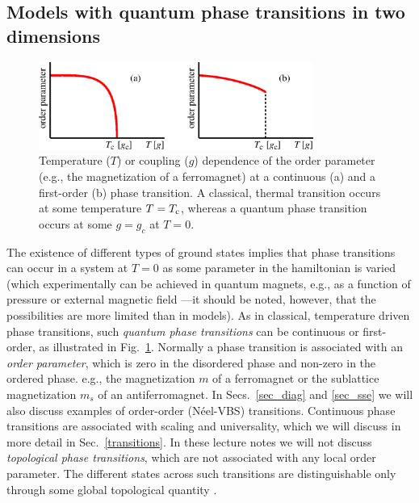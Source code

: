 \documentclass[draft,numberedheadings]{aipproc}
\begin{document}
\subsection{Models with quantum phase transitions in two dimensions}
\label{qtrans}

\begin{figure}
\includegraphics[width=9cm, clip]{ptcases.eps}
\caption{Temperature ($T$) or coupling ($g$) dependence of the order parameter (e.g., the magnetization of a ferromagnet) at a continuous (a) 
and a first-order (b) phase transition. A classical, thermal transition occurs at some temperature $T=T_{\rm c}$, whereas a quantum
phase transition occurs at some $g=g_c$ at $T=0$.}
\label{ptcases}
\end{figure}

The existence of different types of ground states implies that phase transitions can occur in a system at $T=0$ as some parameter in the hamiltonian is varied 
(which experimentally can be achieved in quantum magnets, e.g., as a function of pressure or external magnetic field \cite{ruegg08}---it should be 
noted, however, that the possibilities 
are more limited than in models). As in classical, temperature driven phase transitions, such {\it quantum phase 
transitions} can be continuous or first-order, as illustrated in Fig.~\ref{ptcases}. Normally a phase transition is associated with an {\it order parameter}, 
which is zero in the disordered phase and non-zero in the ordered phase. e.g., the magnetization $m$ of a ferromagnet or the sublattice magnetization $m_s$ of 
an antiferromagnet. In Secs.~\ref{sec_diag} and \ref{sec_sse} we will also discuss examples of order-order (N\'eel-VBS) transitions. Continuous phase transitions 
are associated with scaling and universality, which we will discuss in more detail in Sec.~\ref{transitions}. In these lecture notes we will not discuss 
{\it topological phase transitions}, which are not associated with any local order parameter. The different states across such transitions are distinguishable 
only through some global topological quantity \cite{wenbook}. 
\end{document}
